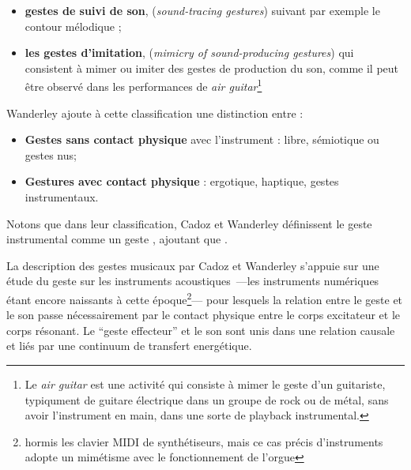 \begin{itemize}[noitemsep]
	\vspace{-1em}
	\begin{itemize}[noitemsep]
		\item \textbf{gestes de suivi de son}, (\textit{sound-tracing gestures}) suivant par exemple le contour mélodique \cite{godoy_exploring_2006};
		\item \textbf{les gestes d'imitation}, (\textit{mimicry of sound-producing gestures}) qui consistent à mimer ou imiter des gestes de production du son, comme il peut être observé dans les performances de \textit{air guitar}\footnote{Le \textit{air guitar} est une activité qui consiste à mimer le geste d’un guitariste, typiqument de guitare électrique dans un groupe de rock ou de métal, sans avoir l’instrument en main, dans une sorte de playback instrumental.} \cite{godoy_playing_2005}
	\end{itemize}
\end{itemize}


\noindent Wanderley ajoute à cette classification une distinction entre :
\vspace{-1em}
\begin{itemize}[noitemsep]
\item \textbf{Gestes sans contact physique} avec l'instrument : libre, sémiotique ou gestes nus;
\item \textbf{Gestures avec contact physique} : ergotique, haptique, gestes instrumentaux.
\end{itemize}


Notons que dans leur classification, Cadoz et Wanderley \cite{todo} définissent le geste instrumental comme un geste , ajoutant que .

La description des gestes musicaux par Cadoz et Wanderley s'appuie sur une étude du geste sur les instruments acoustiques —les instruments numériques étant encore naissants à cette époque\footnote{hormis les clavier MIDI de synthétiseurs, mais ce cas précis d'instruments adopte un mimétisme avec le fonctionnement de l'orgue}— pour lesquels la relation entre le geste et le son passe nécessairement par le contact physique entre le corps excitateur et le corps résonant. Le ``geste effecteur'' et le son sont unis dans une relation causale et liés par une continuum de transfert energétique. 


